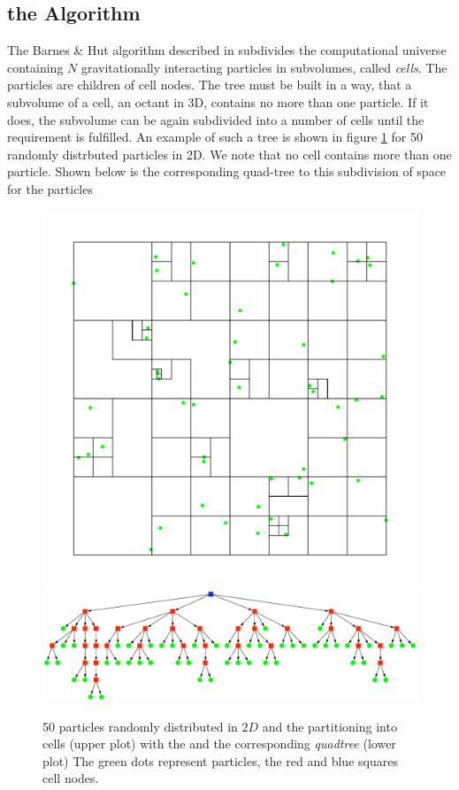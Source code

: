 \subsection{the Algorithm}
The Barnes \& Hut algorithm described in \cite{1986Natur.324..446B} subdivides the computational universe containing $N$ gravitationally interacting particles in subvolumes, called \emph{cells}. The particles are children of cell nodes. The tree must be built in a way, that a subvolume of a cell, an octant in 3D, contains no more than one particle. If it does, the subvolume can be again subdivided into a number of cells until the requirement is fulfilled. An example of such a tree is shown in figure \ref{fig:2D_BHtree} for 50 randomly distrbuted particles in 2D. We note that no cell contains more than one particle. Shown below is the corresponding quad-tree to this subdivision of space for the particles
\begin{figure}[htbp]
\begin{center}
\includegraphics[scale=0.6]{quadtree50_xy.pdf}
\includegraphics[scale=0.3]{quadtree50.pdf}
\caption{50 particles randomly distributed in $2D$ and the partitioning into cells (upper plot) with the and the corresponding \emph{quadtree} (lower plot) The green dots represent particles, the red and blue squares cell nodes.}
\label{fig:2D_BHtree}
\end{center}
\end{figure}\\


